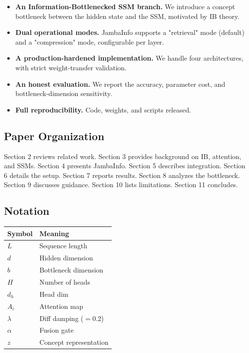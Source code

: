 \begin{itemize}
\item \textbf{An Information-Bottlenecked SSM branch.} We introduce a concept
  bottleneck between the hidden state and the SSM, motivated by IB theory.
\item \textbf{Dual operational modes.} JambaInfo supports a "retrieval" mode (default)
  and a "compression" mode, configurable per layer.
\item \textbf{A production-hardened implementation.} We handle four architectures,
  with strict weight-transfer validation.
\item \textbf{An honest evaluation.} We report the accuracy, parameter cost, and
  bottleneck-dimension sensitivity.
\item \textbf{Full reproducibility.} Code, weights, and scripts released.

\end{itemize}
\subsection{Paper Organization}

Section 2 reviews related work. Section 3 provides background on IB, 
attention, and SSMs. Section 4 presents JambaInfo. Section 5 describes 
integration. Section 6 details the setup. Section 7 reports results. 
Section 8 analyzes the bottleneck. Section 9 discusses guidance. Section 10 
lists limitations. Section 11 concludes.



\subsection{Notation}

\begin{table}[H]
\centering
\small
\begin{tabular}{ll}
\toprule
\textbf{Symbol} & \textbf{Meaning} \\
\midrule
$L$ & Sequence length \\
$d$ & Hidden dimension \\
$b$ & Bottleneck dimension \\
$H$ & Number of heads \\
$d_h$ & Head dim \\
$A_i$ & Attention map \\
$\lambda$ & Diff damping ($= 0.2$) \\
$\alpha$ & Fusion gate \\
$z$ & Concept representation \\
\bottomrule
\end{tabular}
\end{table}

